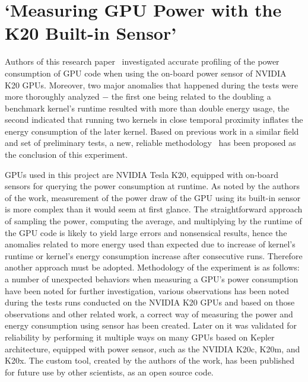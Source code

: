 \newpage
\section{`Measuring GPU Power with the K20 Built-in Sensor'}

Authors of this research paper~\cite{State_of_the_Art_Article_3}
investigated accurate profiling of the power consumption of
GPU code when using the on-board power sensor of NVIDIA K20 GPUs.
Moreover, two major anomalies that happened during the tests
were more thoroughly analyzed $-$ the first one being related to
the doubling a benchmark kernel's runtime resulted with more
than double energy usage, the second indicated that running two
kernels in close temporal proximity inflates the energy
consumption of the later kernel. Based on previous work in
a similar field and set of preliminary tests, a new, reliable
methodology~\cite{K20Power} has been proposed as the conclusion
of this experiment.

GPUs used in this project are NVIDIA Tesla K20, equipped with
on-board sensors for querying the power consumption at runtime.
As noted by the authors of the work, measurement of the power draw
of the GPU using its built-in sensor is more complex than it would
seem at first glance. The straightforward approach of sampling the
power, computing the average, and multiplying by the runtime of the
GPU code is likely to yield large errors and nonsensical results,
hence the anomalies related to more energy used than expected due
to increase of kernel's runtime or kernel's energy consumption
increase after consecutive runs. Therefore another approach must
be adopted. Methodology of the experiment is as follows: a number
of unexpected behaviors when measuring a GPU's power consumption
have been noted for further investigation, various observations
has been noted during the tests runs conducted on the NVIDIA K20
GPUs and based on those observations and other related work,
a correct way of measuring the power and energy consumption using
sensor has been created. Later on it was validated for reliability
by performing it multiple ways on many GPUs based on Kepler
architecture, equipped with power sensor, such as the NVIDIA K20c,
K20m, and K20x. The custom tool, created by the authors of the
work, has been published for future use by other scientists, as an
open source code.

